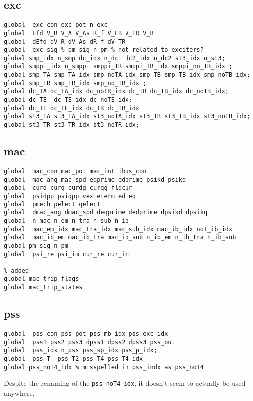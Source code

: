 \subsection{exc}
\begin{verbatim}
global  exc_con exc_pot n_exc
global  Efd V_R V_A V_As R_f V_FB V_TR V_B
global  dEfd dV_R dV_As dR_f dV_TR
global  exc_sig % pm_sig n_pm % not related to exciters?
global smp_idx n_smp dc_idx n_dc  dc2_idx n_dc2 st3_idx n_st3;
global smppi_idx n_smppi smppi_TR smppi_TR_idx smppi_no_TR_idx ;
global smp_TA smp_TA_idx smp_noTA_idx smp_TB smp_TB_idx smp_noTB_idx;
global smp_TR smp_TR_idx smp_no_TR_idx ;
global dc_TA dc_TA_idx dc_noTR_idx dc_TB dc_TB_idx dc_noTB_idx;
global dc_TE  dc_TE_idx dc_noTE_idx;
global dc_TF dc_TF_idx dc_TR dc_TR_idx
global st3_TA st3_TA_idx st3_noTA_idx st3_TB st3_TB_idx st3_noTB_idx;
global st3_TR st3_TR_idx st3_noTR_idx;
\end{verbatim}
\subsection{mac}
\begin{verbatim}
global  mac_con mac_pot mac_int ibus_con
global  mac_ang mac_spd eqprime edprime psikd psikq
global  curd curq curdg curqg fldcur
global  psidpp psiqpp vex eterm ed eq
global  pmech pelect qelect
global  dmac_ang dmac_spd deqprime dedprime dpsikd dpsikq
global  n_mac n_em n_tra n_sub n_ib
global  mac_em_idx mac_tra_idx mac_sub_idx mac_ib_idx not_ib_idx
global  mac_ib_em mac_ib_tra mac_ib_sub n_ib_em n_ib_tra n_ib_sub
global pm_sig n_pm 
global  psi_re psi_im cur_re cur_im

% added
global mac_trip_flags
global mac_trip_states
\end{verbatim}
\subsection{pss}
\begin{verbatim}
global  pss_con pss_pot pss_mb_idx pss_exc_idx
global  pss1 pss2 pss3 dpss1 dpss2 dpss3 pss_out
global  pss_idx n_pss pss_sp_idx pss_p_idx;
global  pss_T  pss_T2 pss_T4 pss_T4_idx  
global pss_noT4_idx % misspelled in pss_indx as pss_noT4
\end{verbatim}
Despite the renaming of the \verb|pss_noT4_idx|, it doesn't seem to actually be used anywhere.
